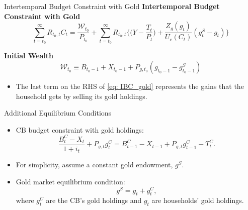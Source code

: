 \documentclass[11pt,aspectratio=169]{beamer}
\begin{document}
\begin{frame}{Intertemporal Budget Constraint with Gold}
\textbf{Intertemporal Budget Constraint with Gold}
\begin{equation} \label{eq: IBC_gold}
\sum_{t=t_0}^{\infty} R_{t_0,t} C_t = \frac{\mathcal{W}_{t_0}}{P_{t_0}} + 
\sum_{t=t_0}^{\infty} R_{t_0,t} \Bigg\{ \Big(Y - \frac{T_t}{P_t}\Big) + \frac{Z_g(g_t)}{U_c(C_t)} (g_t^S - g_t) \Bigg\}
\end{equation}
\vspace{0.15cm}

\textbf{Initial Wealth}
\begin{equation}
\mathcal{W}_{t_0} \equiv B_{t_0-1} + X_{t_0-1} + P_{g,t_0} (g_{t_0-1} - g_{t_0-1}^S)
\end{equation}
\vspace{0.3cm}
\begin{itemize}
    \item The last term on the RHS of \eqref{eq: IBC_gold} represents the gains that the household gets by selling its gold holdings.
\end{itemize}
\end{frame}

\begin{frame}{Additional Equilibrium Conditions}
\begin{itemize}
    \item CB budget constraint with gold holdings:
    \begin{equation}
    \frac{B_{t}^{C}-X_{t}}{1+i_{t}} + P_{g,t} g_{t}^{C} =
    B_{t-1}^{C}-X_{t-1} + P_{g,t} g_{t-1}^{C} - T_{t}^{C}.
    \label{BC_gold}
    \end{equation}
    \vspace{0.2cm}
    \item For simplicity, assume a constant gold endowment, $g^S$.
     \vspace{0.2cm}
    \item Gold market equilibrium condition:
    \begin{equation}
        g^S = g_t + g_t^C,
    \end{equation}
    where $g_t^C$ are the CB’s gold holdings and $g_t$ are households’ gold holdings.
\end{itemize}
\end{frame}
\end{document}

